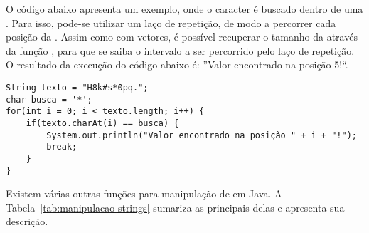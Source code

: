 O código abaixo apresenta um exemplo, onde o caracter  é buscado dentro de uma . Para isso, pode-se utilizar um laço de repetição, de modo a percorrer cada posição da . Assim como com vetores, é possível recuperar o tamanho da  através da função , para que se saiba o intervalo a ser percorrido pelo laço de repetição. O resultado da execução do código abaixo é: ''Valor encontrado na posição 5!``.

\begin{verbatim}
String texto = "H8k#s*0pq.";
char busca = '*';
for(int i = 0; i < texto.length; i++) {
	if(texto.charAt(i) == busca) {
		System.out.println("Valor encontrado na posição " + i + "!");
		break;
	}
}
\end{verbatim}

Existem várias outras funções para manipulação de  em Java. A Tabela~\ref{tab:manipulacao-strings} sumariza as principais delas e apresenta sua descrição.

